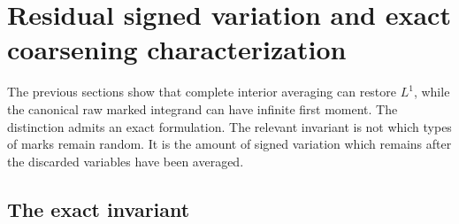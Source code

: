 \section{Residual signed variation and exact coarsening characterization}
\label{sec:coarsening}

The previous sections show that complete interior averaging can restore $L^1$, while the canonical raw marked integrand can have infinite first moment. The distinction admits an exact formulation. The relevant invariant is not which types of marks remain random. It is the amount of signed variation which remains after the discarded variables have been averaged.

\subsection{The exact invariant}

